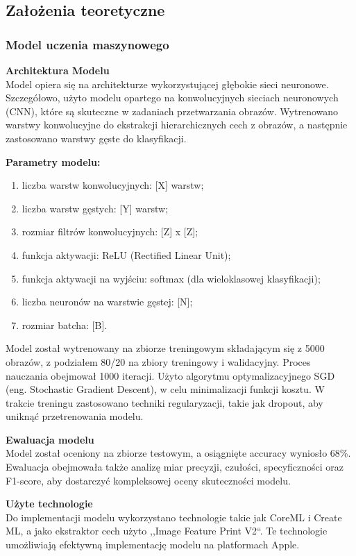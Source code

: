 \documentclass[12pt, a4paper, twoside, openany]{book}
\begin{document}
\subsection{Założenia teoretyczne}
\subsubsection{Model uczenia maszynowego}
\textbf{Architektura Modelu\\}
Model opiera się na architekturze wykorzystującej głębokie sieci neuronowe.
Szczegółowo, użyto modelu opartego na konwolucyjnych sieciach neuronowych (CNN), które są skuteczne w zadaniach przetwarzania obrazów.
Wytrenowano warstwy konwolucyjne do ekstrakcji hierarchicznych cech z obrazów, a następnie zastosowano warstwy gęste do klasyfikacji.

\textbf{Parametry modelu:}
\begin{enumerate}[label=--]
    \item liczba warstw konwolucyjnych: [X] warstw;
    \item liczba warstw gęstych: [Y] warstw;
    \item rozmiar filtrów konwolucyjnych: [Z] x [Z];
    \item funkcja aktywacji: ReLU (Rectified Linear Unit);
    \item funkcja aktywacji na wyjściu: softmax (dla wieloklasowej klasyfikacji);
    \item liczba neuronów na warstwie gęstej: [N];
    \item rozmiar batcha: [B].
\end{enumerate}

Model został wytrenowany na zbiorze treningowym składającym się z 5000 obrazów, z podziałem 80/20 na zbiory treningowy i walidacyjny.
Proces nauczania obejmował 1000 iteracji.
Użyto algorytmu optymalizacyjnego SGD (eng. Stochastic Gradient Descent), w celu minimalizacji funkcji kosztu.
W trakcie treningu zastosowano techniki regularyzacji, takie jak dropout, aby uniknąć przetrenowania modelu.

\textbf{Ewaluacja modelu\\}
Model został oceniony na zbiorze testowym, a osiągnięte accuracy wyniosło 68\%. 
Ewaluacja obejmowała także analizę miar precyzji, czułości, specyficzności oraz F1-score, aby dostarczyć kompleksowej oceny skuteczności modelu.

\textbf{Użyte technologie\\}
Do implementacji modelu wykorzystano technologie takie jak CoreML i Create ML, a jako ekstraktor cech użyto ,,Image Feature Print V2``. 
Te technologie umożliwiają efektywną implementację modelu na platformach Apple.
\end{document}
